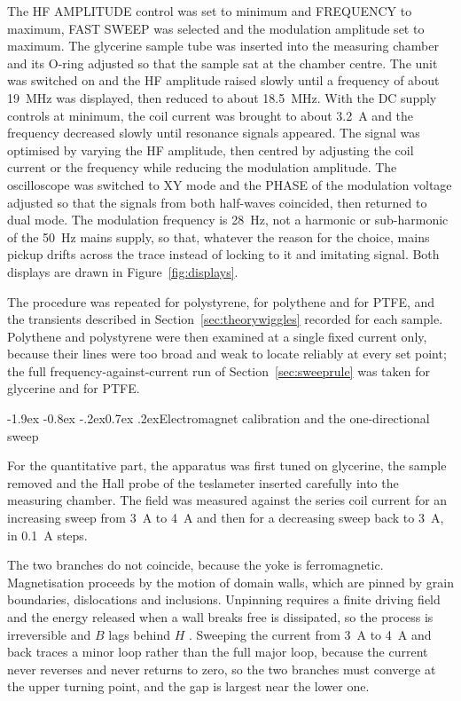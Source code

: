 \documentclass[11pt,a4paper]{article}
\makeatletter
\renewcommand\subsection{\@startsection{subsection}{2}{\z@}%
  {-1.9ex \@plus -0.8ex \@minus -.2ex}{0.7ex \@plus .2ex}{\normalfont\normalsize\bfseries}}
\makeatother
\begin{document}
The HF AMPLITUDE control was set to minimum and FREQUENCY to maximum, FAST SWEEP was selected and
the modulation amplitude set to maximum. The glycerine sample tube was inserted into the measuring
chamber and its O-ring adjusted so that the sample sat at the chamber centre. The unit was
switched on and the HF amplitude raised slowly until a frequency of about \SI{19}{\mega\hertz} was
displayed, then reduced to about \SI{18.5}{\mega\hertz}. With the DC supply controls at minimum,
the coil current was brought to about \SI{3.2}{\ampere} and the frequency decreased slowly until
resonance signals appeared. The signal was optimised by varying the HF amplitude, then centred by
adjusting the coil current or the frequency while reducing the modulation amplitude. The
oscilloscope was switched to XY mode and the PHASE of the modulation voltage adjusted so that the
signals from both half-waves coincided, then returned to dual mode. The modulation frequency is
\SI{28}{\hertz}, not a harmonic or sub-harmonic of the \SI{50}{\hertz} mains supply, so that,
whatever the reason for the choice, mains pickup drifts across the trace instead of locking to it
and imitating signal. Both displays are drawn in Figure~\ref{fig:displays}.

The procedure was repeated for polystyrene, for polythene and for PTFE, and the transients
described in Section~\ref{sec:theorywiggles} recorded for each sample. Polythene and polystyrene
were then examined at a single fixed current only, because their lines were too broad and weak to
locate reliably at every set point; the full frequency-against-current run of
Section~\ref{sec:sweeprule} was taken for glycerine and for PTFE.

\subsection{Electromagnet calibration and the one-directional sweep}
\label{sec:sweeprule}

For the quantitative part, the apparatus was first tuned on glycerine, the sample removed and the
Hall probe of the teslameter inserted carefully into the measuring chamber. The field was measured
against the series coil current for an increasing sweep from \SI{3}{\ampere} to \SI{4}{\ampere}
and then for a decreasing sweep back to \SI{3}{\ampere}, in \SI{0.1}{\ampere} steps.

The two branches do not coincide, because the yoke is ferromagnetic. Magnetisation proceeds by the
motion of domain walls, which are pinned by grain boundaries, dislocations and inclusions.
Unpinning requires a finite driving field and the energy released when a wall breaks free is
dissipated, so the process is irreversible and $B$ lags behind $H$ \cite{cullity}. Sweeping the
current from \SI{3}{\ampere} to \SI{4}{\ampere} and back traces a minor loop rather than the full
major loop, because the current never reverses and never returns to zero, so the two branches
must converge at the upper turning point, and the gap is largest near the lower one.
\end{document}
